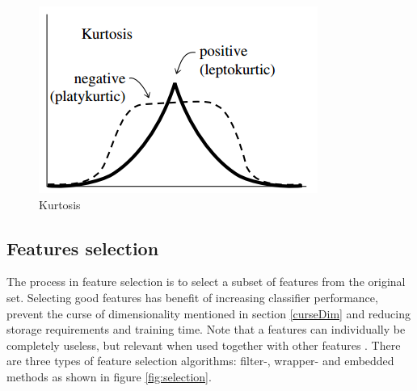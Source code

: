 \documentclass[USenglish]{ifimaster}  %
\begin{document}
	
	\begin{figure}[h]
		\centering
		\includegraphics[scale=0.8]{Figures/Kurtosis}
		\caption{Kurtosis}
		\label{fig:kurtosis}
	\end{figure}
	
	
	
	
	\subsection{Features selection}\label{selection}
	The process in feature selection is to select a subset of features from the original set. Selecting good features has benefit of increasing classifier performance, prevent the curse of dimensionality mentioned in section \ref{curseDim} and reducing storage requirements and training time. Note that a features can individually be completely useless, but relevant when used together with other features \cite{Guyon2006}. 
	There are three types of feature selection algorithms: filter-, wrapper- and embedded methods as shown in figure \ref{fig:selection}. 
	
\end{document}
